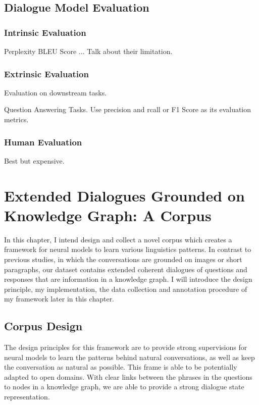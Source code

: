 \documentclass[bsc,frontabs,twoside,singlespacing,parskip,deptreport]{infthesis}     %
\begin{document}
\section{Dialogue Model Evaluation}


\subsection{Intrinsic Evaluation}
Perplexity
BLEU Score
...
Talk about their limitation.


\subsection{Extrinsic Evaluation}

Evaluation on downstream tasks.


Question Answering Tasks. Use precision and rcall or F1 Score as its evaluation metrics.

\subsection{Human Evaluation}

Best but expensive.


\chapter{Extended Dialogues Grounded on Knowledge Graph: A Corpus}

In this chapter, I intend design and collect a novel corpus which creates a framework for neural models to learn various linguistics patterns. In contrast to previous studies\cite{reddy2019coqa,de2017guesswhat,saha2018complex,shekhar2017foil}, in which the conversations are grounded on images or short paragraphs, our dataset contains extended coherent dialogues of questions and responses that are information in a knowledge graph. I will introduce the design principle, my implementation, the data collection and annotation procedure of my framework later in this chapter.

\section{Corpus Design}

The design principles for this framework are to provide strong supervisions for neural models to learn the patterns behind natural conversations, as well as keep the conversation as natural as possible. This frame is able to be potentially adapted to open domains. With clear links between the phrases in the questions to nodes in a knowledge graph, we are able to provide a strong dialogue state representation.
\end{document}
